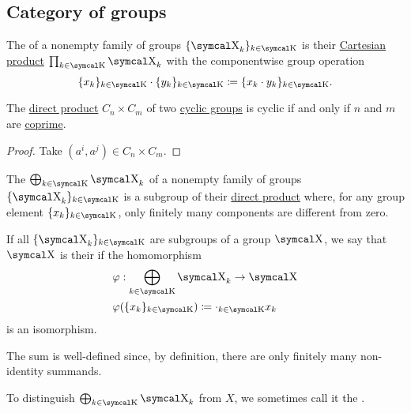 \subsection{Category of groups}\label{subsec:category_of_groups}

\begin{definition}\label{def:group_direct_product}
  The  of a nonempty family of groups \( \{ \CX_k \}_{k \in \CK} \) is their \hyperref[def:cartesian_product]{Cartesian product} \( \prod_{k \in \CK} \CX_k \) with the componentwise group operation
  \begin{equation*}
    \{ x_k \}_{k \in \CK} \cdot \{ y_k \}_{k \in \CK}
    \coloneqq
    \{ x_k \cdot y_k \}_{k \in \CK}.
  \end{equation*}
\end{definition}

\begin{proposition}\label{thm:product_of_cyclic_groups}
  The \hyperref[def:group_direct_product]{direct product} \( C_n \times C_m \) of two \hyperref[def:cyclic_group]{cyclic groups} is cyclic if and only if \( n \) and \( m \) are \hyperref[def:coprime_numbers]{coprime}.
\end{proposition}
\begin{proof}
  Take \( (a^i, a^j) \in C_n \times C_m \).
\end{proof}

\begin{definition}\label{def:group_direct_sum}
  The  \( \bigoplus_{k \in \CK} \CX_k \) of a nonempty family of groups \( \{ \CX_k \}_{k \in \CK} \) is a subgroup of their \hyperref[def:group_direct_sum]{direct product} where, for any group element \( \{ x_k \}_{k \in \CK} \), only finitely many components are different from zero.

  \begin{DefEnum}
    If all \( \{ \CX_k \}_{k \in \CK} \) are subgroups of a group \( \CX \), we say that \( \CX \) is their  if the homomorphism
    \begin{align*}
       &\varphi: \bigoplus_{k \in \CK} \CX_k \to \CX \\
       &\varphi(\{ x_k \}_{k \in \CK}) \coloneqq \cdot_{k \in \CK} x_k
    \end{align*}
    is an isomorphism.

    The sum is well-defined since, by definition, there are only finitely many non-identity summands.

     To distinguish \( \bigoplus_{k \in \CK} \CX_k \) from \( X \), we sometimes call it the .
  \end{DefEnum}
\end{definition}

